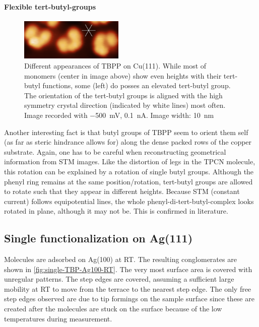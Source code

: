 	\paragraph{Flexible tert-butyl-groups}
	\begin{figure}\centering
		\includegraphics[width=0.44\textwidth]{./images/F151128-083339-10x4-overlay.png}
		\caption{Different appearances of TBPP on Cu(111). While most of monomers (center in image above) show even heights with their tert-butyl functions, some (left) do posses an elevated tert-butyl group. The orientation of the tert-butyl groups is aligned with the high symmetry crystal direction (indicated by white lines) most often. Image recorded with  \SI{-500}{\milli\volt}, \SI{0.1}{\nano\ampere}. Image width: \SI{10}{\nano \meter}}
		\label{fig:TPB-butyl-flexibility-SMT}
	\end{figure}
	
	Another interesting fact is that butyl groups of TBPP seem to orient them self (as far as steric hindrance allows for) along the dense packed rows of the copper substrate. Again, one has to be careful when reconstructing geometrical information from STM images. Like the distortion of legs in the TPCN molecule, this rotation can be explained by a rotation of single butyl groups. Although the phenyl ring remains at the same position/rotation, tert-butyl groups are allowed to rotate such that they appear in different heights. Because STM (constant current) follows equipotential lines, the whole phenyl-di-tert-butyl-complex looks rotated in plane, although it may not be. This is confirmed in literature\cite{heim_surface-assisted_2010, heim_self-assembly_2010}.
	
	\subsection{Single functionalization on Ag(111)}
	\label{sec:single-TBP-Ag100}
	Molecules are adsorbed on Ag(100) at RT. The resulting conglomerates are shown in \autoref{fig:single-TBP-Ag100-RT}. The very most surface area is covered with unregular patterns. The step edges are covered, assuming a sufficient large mobility at RT to move from the terrace to the nearest step edge. The only free step edges observed are due to tip formings on the sample surface since these are created after the molecules are stuck on the surface because of the low temperatures during measurement.
